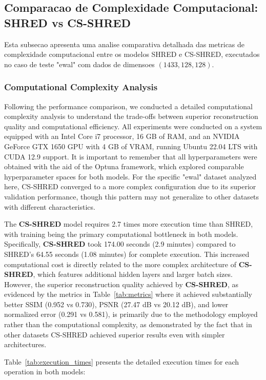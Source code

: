 \subsection{Comparacao de Complexidade Computacional: SHRED vs CS-SHRED}

Esta subsecao apresenta uma analise comparativa detalhada das metricas de complexidade computacional entre os modelos SHRED e CS-SHRED, executados no caso de teste "ewal" com dados de dimensoes $(1433, 128, 128)$.

\subsubsection{Computational Complexity Analysis}

Following the performance comparison, we conducted a detailed computational complexity analysis to understand the trade-offs between superior reconstruction quality and computational efficiency. All experiments were conducted on a system equipped with an Intel Core i7 processor, 16 GB of RAM, and an NVIDIA GeForce GTX 1650 GPU with 4 GB of VRAM, running Ubuntu 22.04 LTS with CUDA 12.9 support. It is important to remember that all hyperparameters were obtained with the aid of the Optuna framework, which explored comparable hyperparameter spaces for both models. For the specific "ewal" dataset analyzed here, CS-SHRED converged to a more complex configuration due to its superior validation performance, though this pattern may not generalize to other datasets with different characteristics.

The \textbf{CS-SHRED} model requires 2.7 times more execution time than SHRED, with training being the primary computational bottleneck in both models. Specifically, \textbf{CS-SHRED} took 174.00 seconds (2.9 minutes) compared to SHRED's 64.55 seconds (1.08 minutes) for complete execution. This increased computational cost is directly related to the more complex architecture of \textbf{CS-SHRED}, which features additional hidden layers and larger batch sizes. However, the superior reconstruction quality achieved by \textbf{CS-SHRED}, as evidenced by the metrics in Table~\ref{tab:metrics} where it achieved substantially better SSIM (0.952 vs 0.730), PSNR (27.47 dB vs 20.12 dB), and lower normalized error (0.291 vs 0.581), is primarily due to the methodology employed rather than the computational complexity, as demonstrated by the fact that in other datasets CS-SHRED achieved superior results even with simpler architectures.

Table~\ref{tab:execution_times} presents the detailed execution times for each operation in both models:

